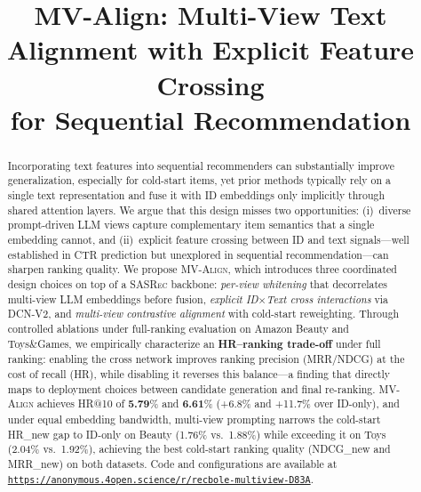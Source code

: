 \documentclass[sigconf,natbib=true,anonymous]{acmart}
\newcommand{\model}{\textsc{MV-Align}\xspace}
\newcommand{\base}{\textsc{SASRec}\xspace}
\newcommand{\llm}{\textsc{LLM}\xspace}
\begin{document}
\title{MV-Align: Multi-View Text Alignment with Explicit Feature Crossing\\
for Sequential Recommendation}


\begin{abstract}
Incorporating text features into sequential recommenders can substantially improve generalization, especially for cold-start items, yet prior methods typically rely on a single text representation and fuse it with ID embeddings only implicitly through shared attention layers.
We argue that this design misses two opportunities: (i)~diverse prompt-driven \llm views capture complementary item semantics that a single embedding cannot, and (ii)~explicit feature crossing between ID and text signals---well established in CTR prediction but unexplored in sequential recommendation---can sharpen ranking quality.
%
We propose \model, which introduces three coordinated design choices on top of a \base backbone: \emph{per-view whitening} that decorrelates multi-view \llm embeddings before fusion, \emph{explicit ID$\times$Text cross interactions} via DCN-V2, and \emph{multi-view contrastive alignment} with cold-start reweighting.
Through controlled ablations under full-ranking evaluation on Amazon Beauty and Toys\&Games, we empirically characterize an \textbf{HR--ranking trade-off} under full ranking: enabling the cross network improves ranking precision (MRR/NDCG) at the cost of recall (HR), while disabling it reverses this balance---a finding that directly maps to deployment choices between candidate generation and final re-ranking.
%
\model achieves HR@10 of \textbf{5.79}\% and \textbf{6.61}\% (+6.8\% and +11.7\% over ID-only), and under equal embedding bandwidth, multi-view prompting narrows the cold-start HR\_new gap to ID-only on Beauty (1.76\% vs.\ 1.88\%) while exceeding it on Toys (2.04\% vs.\ 1.92\%), achieving the best cold-start ranking quality (NDCG\_new and MRR\_new) on both datasets.
Code and configurations are available at \texttt{\url{https://anonymous.4open.science/r/recbole-multiview-D83A}}.
\end{abstract}


\maketitle
\end{document}
